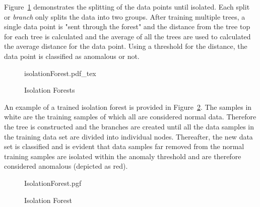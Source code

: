 Figure~\ref{Figure-Isolation_Forest} demonstrates the splitting of the data points until isolated. Each split or \emph{branch} only splits the data into two groups. After training multiple trees, a single data point is "sent through the forest" and the distance from the tree top for each tree is calculated and the average of all the trees are used to calculated the average distance for the data point. Using a threshold for the distance, the data point is classified as anomalous or not.

%	
%	

\begin{figure}[!hbt]
	\centering
	\def\svgwidth{16cm}
	{isolationForest.pdf_tex}
	\caption[Isolation Forest]{Isolation Forests \cite{Chen2020}}
	\label{Figure-Isolation_Forest} 
\end{figure}

An example of a trained isolation forest is provided in Figure~\ref{fig:IsolationForest}. The samples in white are the training samples of which all are considered normal data. Therefore the tree is constructed and the branches are created until all the data samples in the training data set are divided into individual nodes. Thereafter, the new data set is classified and is evident that data samples far removed from the normal training samples are isolated within the anomaly threshold and are therefore considered anomalous (depicted as red).
\begin{figure}[!hbt]
	\centering
	{IsolationForest.pgf}
	\caption{Isolation Forest}
	\label{fig:IsolationForest}
\end{figure}

